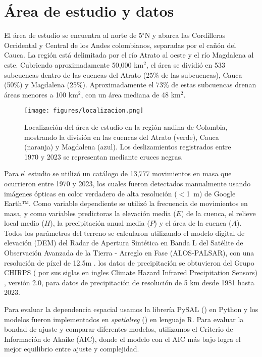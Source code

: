 \documentclass[
  manuscript=article,  
  layout=preprint,  
  year=2023,
  volume=0,
]{format}
\begin{document}
\section{Área de estudio y datos}
\par El área de estudio se encuentra al norte de 5$^{\circ}$N y abarca las Cordilleras Occidental y Central de los Andes colombianos, separadas por el cañón del Cauca. La región está delimitada por el río Atrato al oeste y el río Magdalena al este. Cubriendo aproximadamente 50,000 km$^2$, el área se dividió en 533 subcuencas dentro de las cuencas del Atrato (25\% de las subcuencas), Cauca (50\%) y Magdalena (25\%). Aproximadamente el 73\% de estas subcuencas drenan áreas menores a 100 km$^2$, con un área mediana de 48 km$^2$.

\begin{figure}[ht!]
    \centering
        \centering
        \texttt{[image: figures/localizacion.png]}
        \caption{Localización del área de estudio en la región andina de Colombia, mostrando la división en las cuencas del Atrato (verde), Cauca (naranja) y Magdalena (azul). Los deslizamientos registrados entre 1970 y 2023 se representan mediante cruces negras.}
        \label{fig:location}
\end{figure}

\par Para el estudio se utilizó un catálogo de 13,777 movimientos en masa que ocurrieron entre 1970 y 2023, los cuales fueron detectados manualmente usando imágenes ópticas en color verdadero de alta resolución ($<$1~m) de Google Earth™. Como variable dependiente se utilizó la frecuencia de movimientos en masa, y como variables predictoras la elevación media ($E$) de la cuenca, el relieve local medio ($H$), la precipitación anual media ($P$) y el área de la cuenca ($A$). Todos los parámetros del terreno se calcularon utilizando el modelo digital de elevación (DEM) del Radar de Apertura Sintética en Banda L del Satélite de Observación Avanzada de la Tierra - Arreglo en Fase (ALOS-PALSAR), con una resolución de píxel de 12.5m \cite{logan2014}. los datos de precipitación se obtuvieron del Grupo CHIRPS ( por sus siglas en ingles Climate Hazard Infrared Precipitation Sensors) \cite{funk2015}, versión 2.0, para datos de precipitación de resolución de 5 km desde 1981 hasta 2023.

\par Para evaluar la dependencia espacial usamos la librería PySAL (\cite{pysal2007}) en Python y los modelos fueron implementados en \textit{spatialreg} (\cite{bivand2022}) en lenguaje R. Para evaluar la bondad de ajuste y comparar diferentes modelos, utilizamos el Criterio de Información de Akaike (AIC), donde el modelo con el AIC más bajo logra el mejor equilibrio entre ajuste y complejidad.
\end{document}
